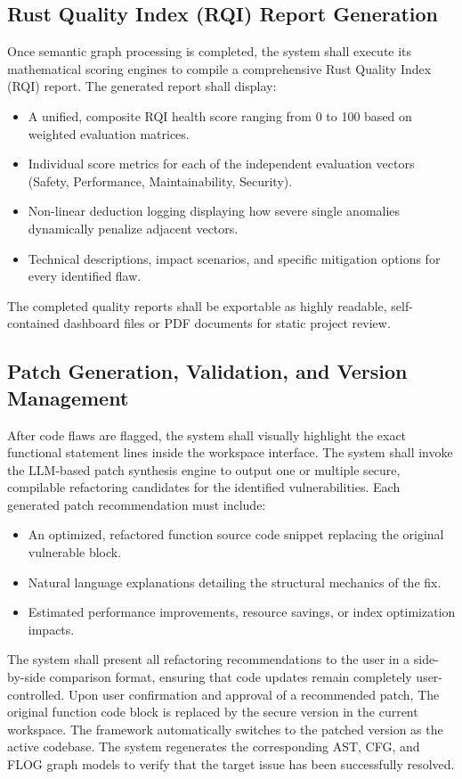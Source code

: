 \subsection{Rust Quality Index (RQI) Report Generation}
\hspace{0.5cm}
Once semantic graph processing is completed, the system shall execute its mathematical scoring engines to compile a comprehensive Rust Quality Index (RQI) report.
The generated report shall display:
\begin{itemize}
    \item A unified, composite RQI health score ranging from 0 to 100 based on weighted evaluation matrices.
    \item Individual score metrics for each of the independent evaluation vectors (Safety, Performance, Maintainability, Security).
    \item Non-linear deduction logging displaying how severe single anomalies dynamically penalize adjacent vectors.
    \item Technical descriptions, impact scenarios, and specific mitigation options for every identified flaw.
\end{itemize}
The completed quality reports shall be exportable as highly readable, self-contained dashboard files or PDF documents for static project review.

\subsection{Patch Generation, Validation, and Version Management}
\hspace{0.5cm}
After code flaws are flagged, the system shall visually highlight the exact functional statement lines inside the workspace interface. The system shall invoke the LLM-based patch synthesis engine to output one or multiple secure, compilable refactoring candidates for the identified vulnerabilities.
Each generated patch recommendation must include:
\begin{itemize}
\item An optimized, refactored function source code snippet replacing the original vulnerable block.
\item Natural language explanations detailing the structural mechanics of the fix.
\item Estimated performance improvements, resource savings, or index optimization impacts.
\end{itemize}
The system shall present all refactoring recommendations to the user in a side-by-side comparison format, ensuring that code updates remain completely user-controlled. Upon user confirmation and approval of a recommended patch, The original function code block is replaced by the secure version in the current workspace. The framework automatically switches to the patched version as the active codebase. The system regenerates the corresponding AST, CFG, and FLOG graph models to verify that the target issue has been successfully resolved.

